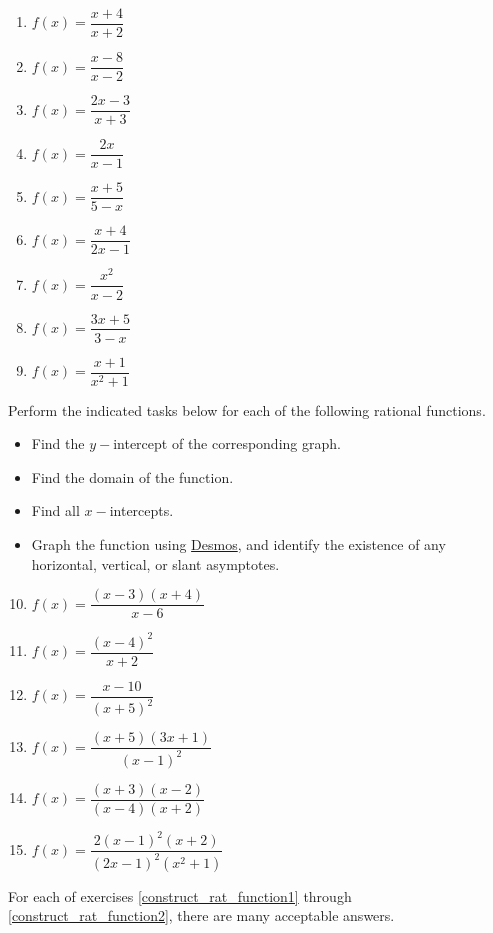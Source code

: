 \documentclass[12pt]{book}
\theoremstyle{definition}
\newcommand{\Desmos}{\href{https://www.desmos.com/}{Desmos}}
\begin{document}
		\begin{multicols}{3}
			\begin{enumerate}
				\item\label{rat_exs1} $f(x)=\dfrac{x+4}{x+2}$
				\item $f(x)=\dfrac{x-8}{x-2}$
				\item $f(x)=\dfrac{2x-3}{x+3}$
				\item $f(x)=\dfrac{2x}{x-1}$
				\item $f(x)=\dfrac{x+5}{5-x}$
				\item $f(x)=\dfrac{x+4}{2x-1}$
				\item $f(x)=\dfrac{x^2}{x-2}$
				\item $f(x)=\dfrac{3x+5}{3-x}$
				\item\label{rat_exs2} $f(x)=\dfrac{x+1}{x^2+1}$
			\end{enumerate}
		\end{multicols}
Perform the indicated tasks below for each of the following rational functions.
		\begin{itemize}
			\item Find the $y-$intercept of the corresponding graph.
			\item Find the domain of the function.
			\item Find all $x-$intercepts.
			\item Graph the function using \Desmos, and identify the existence of any horizontal, vertical, or slant asymptotes.
		\end{itemize}
		\begin{multicols}{3}
			\begin{enumerate}
			\setcounter{enumi}{9}
				\item $f(x)=\dfrac{(x-3)(x+4)}{x-6}$
				\item $f(x)=\dfrac{(x-4)^2}{x+2}$
				\item $f(x)=\dfrac{x-10}{(x+5)^2}$
				\item $f(x)=\dfrac{(x+5)(3x+1)}{(x-1)^2}$
				\item $f(x)=\dfrac{(x+3)(x-2)}{(x-4)(x+2)}$
				\item $f(x)=\dfrac{2(x-1)^2(x+2)}{(2x-1)^2(x^2+1)}$
			\end{enumerate}
		\end{multicols}
For each of exercises \ref{construct_rat_function1} through \ref{construct_rat_function2}, there are many acceptable answers.
\end{document}
